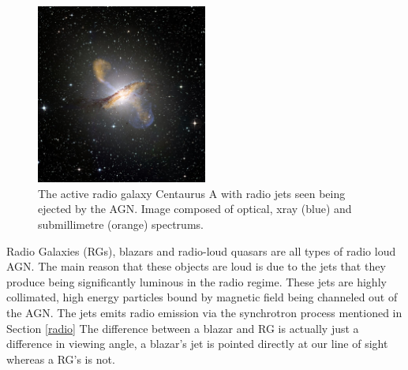 \documentclass[a4paper, 10pt]{article}
\begin{document}
\begin{figure}[H]
\begin{center}
	\includegraphics[width=0.5\textwidth]{CA}
	\caption{The active radio galaxy Centaurus A with radio jets seen being ejected by the AGN. Image composed of optical, xray (blue) and submillimetre (orange) spectrums\footnotemark.}
	\label{agn}
\end{center}
\end{figure}
Radio Galaxies (RGs), blazars and radio-loud quasars are all types of radio loud AGN. The main reason that these objects are loud is due to the jets that they produce being significantly luminous in the radio regime. These jets are highly collimated, high energy particles bound by magnetic field being channeled out of the AGN. The jets emits radio emission via the synchrotron process mentioned in Section \ref{radio} The difference between a blazar and RG is actually just a difference in viewing angle, a blazar's jet is pointed directly at our line of sight whereas a RG's is not.\\
\end{document}
